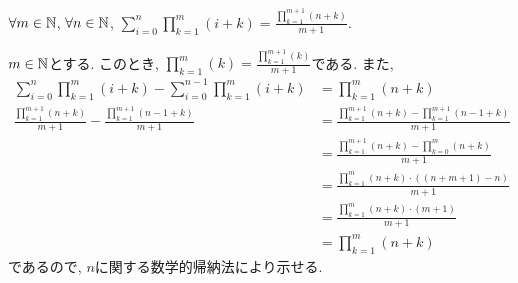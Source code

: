 \begin{prop}
  \label{p:20230718}
  $\forall m\in \mathbb{N}$,
  $\forall n\in \mathbb{N}$,
  $\sum_{i=0}^n \prod_{k=1}^{m}(i+k)=\frac{\prod_{k=1}^{m+1}(n+k)}{m+1}$.
\end{prop}

\begin{proof**}
  $m\in\mathbb{N}$とする.
  このとき,
  $\prod_{k=1}^{m}(k)=\frac{\prod_{k=1}^{m+1}(k)}{m+1}$である.
  また,
  \begin{align*}
    \sum_{i=0}^n \prod_{k=1}^{m}(i+k)-\sum_{i=0}^{n-1} \prod_{k=1}^{m}(i+k)
    &=\prod_{k=1}^{m}(n+k)\\
  \frac{\prod_{k=1}^{m+1}(n+k)}{m+1}
  -
  \frac{\prod_{k=1}^{m+1}(n-1+k)}{m+1}
  &=
  \frac{\prod_{k=1}^{m+1}(n+k)-\prod_{k=1}^{m+1}(n-1+k)}{m+1}
  \\&=
  \frac{\prod_{k=1}^{m+1}(n+k)-\prod_{k=0}^{m}(n+k)}{m+1} 
  \\&=
  \frac{\prod_{k=1}^{m}(n+k)\cdot((n+m+1)-n)}{m+1}
  \\&=\frac{\prod_{k=1}^{m}(n+k)\cdot(m+1)}{m+1}
  \\&=\prod_{k=1}^{m}(n+k)
  \end{align*}
  であるので,
  $n$に関する数学的帰納法により示せる.
\end{proof**}

